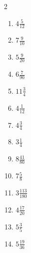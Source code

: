 \documentclass[12pt]{article}
\begin{document}
\begin{multicols}{2}
\begin{enumerate}
\item $ 4 \frac{5}{12} $
\item $ 7 \frac{9}{10} $
\item $ 5 \frac{9}{20} $
\item $ 6 \frac{7}{90} $
\item $ 11 \frac{3}{4} $
\item $ 4 \frac{1}{12} $
\item $ 4 \frac{3}{4} $
\item $ 3 \frac{1}{4} $
\item $ 8 \frac{41}{80} $
\item $ 7 \frac{5}{8} $
\item $ 3 \frac{113}{180} $
\item $ 4 \frac{17}{20} $
\item $ 5 \frac{3}{5} $
\item $ 5 \frac{19}{36} $
\end{enumerate}\end{multicols}\newpage
\end{document}
